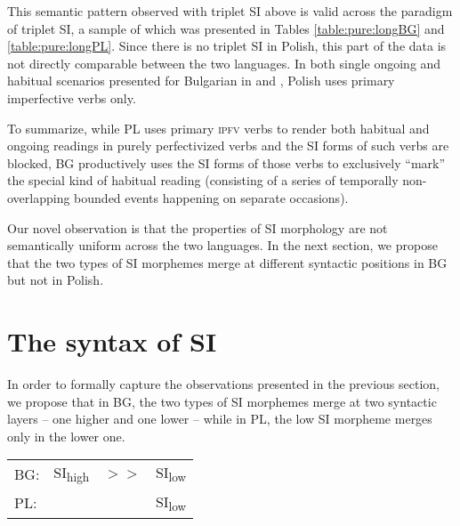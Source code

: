 \documentclass[output=paper,colorlinks,citecolor=brown]{langscibook}
\begin{document}

\noindent This semantic pattern observed with triplet SI above is valid across the paradigm of triplet SI, a sample of which was presented in Tables \ref{table:pure:longBG} and \ref{table:pure:longPL}. Since there is no triplet SI in Polish, this part of the data is not directly comparable between the two languages. In both single ongoing and habitual scenarios presented for Bulgarian in  and , Polish uses primary imperfective verbs only. 


To summarize, while PL
uses primary \textsc{ipfv} verbs to render both habitual and ongoing readings in purely perfectivized verbs and the SI forms of such verbs are blocked, BG productively uses the SI forms of those verbs to exclusively ``mark'' the special kind of habitual reading (consisting of a series of temporally non-overlapping bounded events happening on separate occasions).



Our  novel observation is that the properties of SI morphology are not semantically uniform across the two languages. In the next section, we propose that the two types of SI morphemes merge at different syntactic positions in BG but not in Polish. 




\section{The syntax of SI}\label{section:cinque}



In order to formally capture the observations presented in the previous section, we propose that in BG, the two types of SI morphemes merge at two syntactic layers -- one higher and one lower -- while in PL, the low SI morpheme merges only in the lower one. 

\ea \begin{tabular}[t]{l l c c}
BG: & SI\textsubscript{high} &  $>>$  & SI\textsubscript{low}\\
PL: &           &          & SI\textsubscript{low}\\
\end{tabular}
\z
\end{document}
